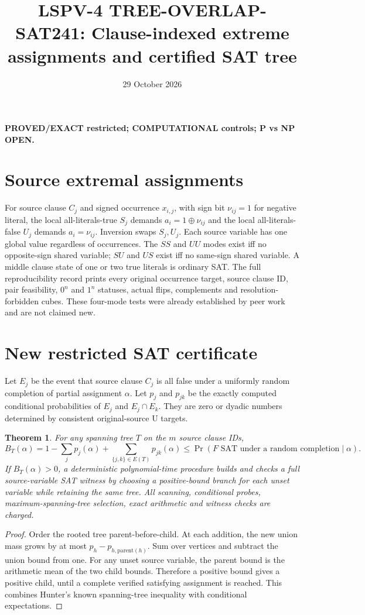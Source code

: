 \documentclass{article}
\title{LSPV-4 TREE-OVERLAP-SAT241: Clause-indexed extreme assignments and certified SAT tree}
\date{29 October 2026}
\newtheorem{theorem}{Theorem}
\begin{document}
\maketitle
\noindent\textbf{PROVED/EXACT restricted; COMPUTATIONAL controls; P vs NP OPEN.}

\section{Source extremal assignments}
For source clause $C_j$ and signed occurrence $x_{i,j}$, with sign bit $\nu_{ij}=1$ for negative literal, the local all-literals-true $S_j$ demands $a_i=1\oplus\nu_{ij}$ and the local all-literals-false $U_j$ demands $a_i=\nu_{ij}$. Inversion swaps $S_j,U_j$. Each source variable has one global value regardless of occurrences. The $SS$ and $UU$ modes exist iff no opposite-sign shared variable; $SU$ and $US$ exist iff no same-sign shared variable. A middle clause state of one or two true literals is ordinary SAT. The full reproducibility record prints every original occurrence target, source clause ID, pair feasibility, $0^n$ and $1^n$ statuses, actual flips, complements and resolution-forbidden cubes. These four-mode tests were already established by peer work and are not claimed new.

\section{New restricted SAT certificate}
Let $E_j$ be the event that source clause $C_j$ is all false under a uniformly random completion of partial assignment $\alpha$. Let $p_j$ and $p_{jk}$ be the exactly computed conditional probabilities of $E_j$ and $E_j\cap E_k$. They are zero or dyadic numbers determined by consistent original-source U targets.
\begin{theorem}
For any spanning tree $T$ on the $m$ source clause IDs,
\[
B_T(\alpha)=1-\sum_j p_j(\alpha)+\sum_{\{j,k\}\in E(T)}p_{jk}(\alpha)
\le\Pr(F\text{ SAT under a random completion}\mid\alpha).
\]
If $B_T(\alpha)>0$, a deterministic polynomial-time procedure builds and checks a full source-variable SAT witness by choosing a positive-bound branch for each unset variable while retaining the same tree. All scanning, conditional probes, maximum-spanning-tree selection, exact arithmetic and witness checks are charged.
\end{theorem}
\begin{proof}
Order the rooted tree parent-before-child. At each addition, the new union mass grows by at most $p_h-p_{h,\mathrm{parent}(h)}$. Sum over vertices and subtract the union bound from one. For any unset source variable, the parent bound is the arithmetic mean of the two child bounds. Therefore a positive bound gives a positive child, until a complete verified satisfying assignment is reached. This combines Hunter's known spanning-tree inequality with conditional expectations.
\end{proof}
\end{document}
